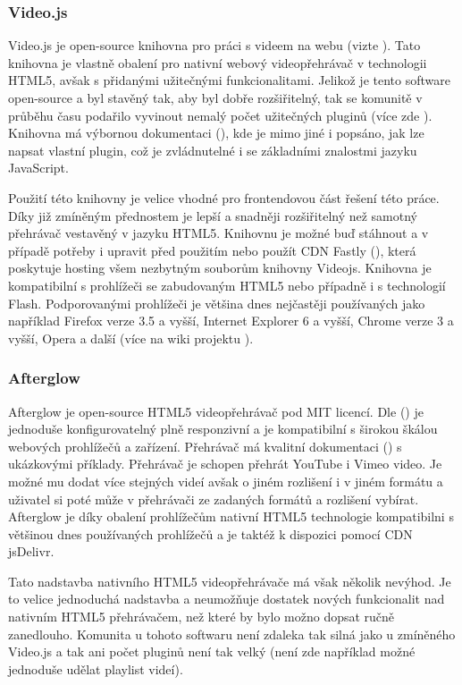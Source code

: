 \documentclass[thesis=M,czech]{FITthesis}[2012/06/26]
\begin{document}
\subsubsection{Video.js} \label{subsubsec:analyza_reseni_videojs}
Video.js je open-source knihovna pro práci s videem na webu (vizte \cite{videojs_web}). Tato knihovna je vlastně obalení pro nativní webový videopřehrávač v technologii HTML5, avšak s přidanými užitečnými funkcionalitami. Jelikož je tento software open-source a byl stavěný tak, aby byl dobře rozšiřitelný, tak se komunitě v průběhu času podařilo vyvinout nemalý počet užitečných pluginů (více zde \cite{videojs_plg}). Knihovna má výbornou dokumentaci (\cite{videojs_doc}), kde je mimo jiné i popsáno, jak lze napsat vlastní plugin, což je zvládnutelné i se základními znalostmi jazyku JavaScript. 
	
	Použití této knihovny je velice vhodné pro frontendovou část řešení této práce. Díky již zmíněným přednostem je lepší a snadněji rozšiřitelný než samotný přehrávač vestavěný v jazyku HTML5. Knihovnu je možné buď stáhnout a v případě potřeby i upravit před použitím nebo použít CDN Fastly (\cite{fastly_cdn}), která poskytuje hosting všem nezbytným souborům knihovny Videojs. Knihovna je kompatibilní s prohlížeči se zabudovaným HTML5 nebo případně i s technologií Flash. Podporovanými prohlížeči je většina dnes nejčastěji používaných jako například Firefox verze 3.5 a vyšší, Internet Explorer 6 a vyšší, Chrome verze 3 a vyšší, Opera a další (více na wiki projektu \cite{videojs_wiki}).

\subsubsection{Afterglow} \label{subsubsec:analyza_reseni_afterglow}
Afterglow je open-source HTML5 videopřehrávač pod MIT licencí. Dle (\cite{afterglow}) je jednoduše konfigurovatelný plně responzivní a je kompatibilní s širokou škálou webových prohlížečů a zařízení. Přehrávač má kvalitní dokumentaci (\cite{afterglow_doc}) s ukázkovými příklady. Přehrávač je schopen přehrát YouTube i Vimeo video. Je možné mu dodat více stejných videí avšak o jiném rozlišení i v jiném formátu a uživatel si poté může v přehrávači ze zadaných formátů a rozlišení vybírat. Afterglow je díky obalení prohlížečům nativní HTML5 technologie kompatibilni s většinou dnes používaných prohlížečů a je taktéž k dispozici pomocí CDN jsDelivr.
	
	Tato nadstavba nativního HTML5 videopřehrávače má však několik nevýhod. Je to velice jednoduchá nadstavba a neumožňuje dostatek nových funkcionalit nad nativním HTML5 přehrávačem, než které by bylo možno dopsat ručně zanedlouho. Komunita u tohoto softwaru není zdaleka tak silná jako u zmíněného Video.js a tak ani počet pluginů není tak velký (není zde například možné jednoduše udělat playlist videí).
\end{document}
